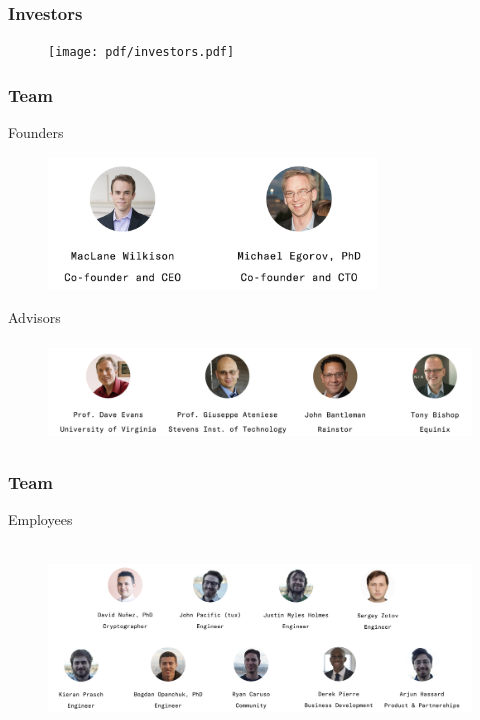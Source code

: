 \documentclass[xetex,mathsans,sans,aspectratio=169]{beamer}
\begin{document}
    \begin{frame}
      \frametitle{Investors}
        \begin{figure}
            \centering
            \texttt{[image: pdf/investors.pdf]}
        \end{figure}
    \end{frame}

    \begin{frame}
      \frametitle{Team}
        Founders
        \begin{figure}
            \centering
            \includegraphics[height=3.5cm]{pdf/founders-from-website.pdf}
        \end{figure}
        Advisors
        \begin{figure}
            \centering
            \includegraphics[height=2.7cm]{pdf/advisors-from-website.pdf}
        \end{figure}
    \end{frame}
    
    \begin{frame}
      \frametitle{Team}
      Employees
      \begin{figure}
        \centering
        \includegraphics[height=5cm]{pdf/employees.pdf}
      \end{figure}
    \end{frame}
\end{document}
